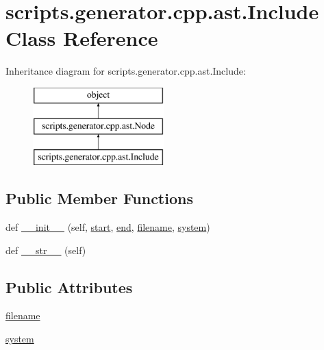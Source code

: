 \hypertarget{classscripts_1_1generator_1_1cpp_1_1ast_1_1_include}{}\section{scripts.\+generator.\+cpp.\+ast.\+Include Class Reference}
\label{classscripts_1_1generator_1_1cpp_1_1ast_1_1_include}
Inheritance diagram for scripts.\+generator.\+cpp.\+ast.\+Include\+:\begin{figure}[H]
\begin{center}
\leavevmode
\includegraphics[height=3.000000cm]{d1/d11/classscripts_1_1generator_1_1cpp_1_1ast_1_1_include}
\end{center}
\end{figure}
\subsection*{Public Member Functions}
\begin{DoxyCompactItemize}
\item 
def \mbox{\hyperlink{classscripts_1_1generator_1_1cpp_1_1ast_1_1_include_a39c7009f0bad1cf5d5ebb9d865eb80f5}{\+\_\+\+\_\+init\+\_\+\+\_\+}} (self, \mbox{\hyperlink{classscripts_1_1generator_1_1cpp_1_1ast_1_1_node_a27ce0a583baee598b75ac6dd21f8575b}{start}}, \mbox{\hyperlink{classscripts_1_1generator_1_1cpp_1_1ast_1_1_node_a8e3394f9dd405352610ff9be4f284e2c}{end}}, \mbox{\hyperlink{classscripts_1_1generator_1_1cpp_1_1ast_1_1_include_a48e9d7ce08bb32c4fa38e3baab527c01}{filename}}, \mbox{\hyperlink{classscripts_1_1generator_1_1cpp_1_1ast_1_1_include_a709a17ef8542e60f574db44050514ac8}{system}})
\item 
def \mbox{\hyperlink{classscripts_1_1generator_1_1cpp_1_1ast_1_1_include_a4e477de864608659394b87a4aee141f0}{\+\_\+\+\_\+str\+\_\+\+\_\+}} (self)
\end{DoxyCompactItemize}
\subsection*{Public Attributes}
\begin{DoxyCompactItemize}
\item 
\mbox{\hyperlink{classscripts_1_1generator_1_1cpp_1_1ast_1_1_include_a48e9d7ce08bb32c4fa38e3baab527c01}{filename}}
\item 
\mbox{\hyperlink{classscripts_1_1generator_1_1cpp_1_1ast_1_1_include_a709a17ef8542e60f574db44050514ac8}{system}}
\end{DoxyCompactItemize}


